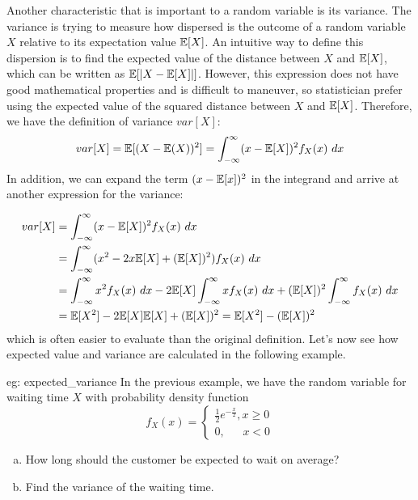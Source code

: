 Another characteristic that is important to a random variable is its variance.  The variance is trying to measure how dispersed is the outcome of a random variable $X$ relative to its expectation value $\mathbb{E}[X]$.  An intuitive way to define this dispersion is to find the expected value of the distance between $X$ and $\mathbb{E}[X]$, which can be written as $\mathbb{E}[|X - \mathbb{E}[X]|]$.  However, this expression does not have good mathematical properties and is difficult to maneuver, so statistician prefer using the expected value of the squared distance between $X$ and $\mathbb{E}[X]$.  Therefore, we have the definition of variance $var[X]$:
\[var[X] = \mathbb{E}[(X-\mathbb{E}(X))^2] = \int_{-\infty}^{\infty} (x - \mathbb{E}[X])^2 f_X(x)~dx\]
In addition, we can expand the term $(x-\mathbb{E}[x])^2$ in the integrand and arrive at another expression for the variance:

\pagebreak

\begin{align*}
    var[X] &= \int_{-\infty}^{\infty} (x-\mathbb{E}[X])^2 f_X(x)~dx\\
    &= \int_{-\infty}^{\infty} (x^2 - 2x\mathbb{E}[X] + (\mathbb{E}[X])^2) f_X(x)~dx\\
    &= \int_{-\infty}^{\infty} x^2 f_X(x)~dx - 2\mathbb{E}[X] \int_{-\infty}^{\infty} x f_X(x)~dx + (\mathbb{E}[X])^2 \int_{-\infty}^{\infty} f_X(x)~dx\\
    &= \mathbb{E}[X^2] - 2 \mathbb{E}[X] \mathbb{E}[X] + (\mathbb{E}[X])^2 = \mathbb{E}[X^2] - (\mathbb{E}[X])^2
\end{align*}
which is often easier to evaluate than the original definition.  Let's now see how expected value and variance are calculated in the following example.

\begin{eg}[]{eg: expected_variance}
    In the previous example, we have the random variable for waiting time $X$ with probability density function
    \[f_X(x) = \begin{cases}
        \frac{1}{2}e^{-\frac{x}{2}}, x \ge 0\\
        0, \quad \;\; x < 0
    \end{cases}\]
    \begin{enumerate}[a)]
        \item How long should the customer be expected to wait on average?
        \item Find the variance of the waiting time.
    \end{enumerate}
\end{eg}

